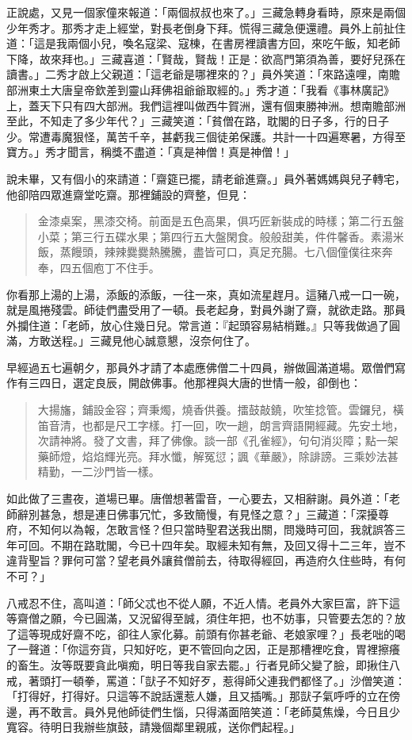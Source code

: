 正說處，又見一個家僮來報道：「兩個叔叔也來了。」三藏急轉身看時，原來是兩個少年秀才。那秀才走上經堂，對長老倒身下拜。慌得三藏急便還禮。員外上前扯住道：「這是我兩個小兒，喚名寇梁、寇棟，在書房裡讀書方回，來吃午飯，知老師下降，故來拜也。」三藏喜道：「賢哉，賢哉！正是：欲高門第須為善，要好兒孫在讀書。」二秀才啟上父親道：「這老爺是哪裡來的？」員外笑道：「來路遠哩，南贍部洲東土大唐皇帝欽差到靈山拜佛祖爺爺取經的。」秀才道：「我看《事林廣記》上，蓋天下只有四大部洲。我們這裡叫做西牛賀洲，還有個東勝神洲。想南贍部洲至此，不知走了多少年代？」三藏笑道：「貧僧在路，耽閣的日子多，行的日子少。常遭毒魔狠怪，萬苦千辛，甚虧我三個徒弟保護。共計一十四遍寒暑，方得至寶方。」秀才聞言，稱獎不盡道：「真是神僧！真是神僧！」

說未畢，又有個小的來請道：「齋筵已擺，請老爺進齋。」員外著媽媽與兒子轉宅，他卻陪四眾進齋堂吃齋。那裡鋪設的齊整，但見：
\begin{quote}
金漆桌案，黑漆交椅。前面是五色高果，俱巧匠新裝成的時樣；第二行五盤小菜；第三行五碟水果；第四行五大盤閑食。般般甜美，件件馨香。素湯米飯，蒸饅頭，辣辣爨爨熱騰騰，盡皆可口，真足充腸。七八個僮僕往來奔奉，四五個庖丁不住手。
\end{quote}

你看那上湯的上湯，添飯的添飯，一往一來，真如流星趕月。這豬八戒一口一碗，就是風捲殘雲。師徒們盡受用了一頓。長老起身，對員外謝了齋，就欲走路。那員外攔住道：「老師，放心住幾日兒。常言道：『起頭容易結梢難。』只等我做過了圓滿，方敢送程。」三藏見他心誠意懇，沒奈何住了。

早經過五七遍朝夕，那員外才請了本處應佛僧二十四員，辦做圓滿道場。眾僧們寫作有三四日，選定良辰，開啟佛事。他那裡與大唐的世情一般，卻倒也：
\begin{quote}
大揚旛，鋪設金容；齊秉燭，燒香供養。擂鼓敲鐃，吹笙捻管。雲鑼兒，橫笛音清，也都是尺工字樣。打一回，吹一趟，朗言齊語開經藏。先安土地，次請神將。發了文書，拜了佛像。談一部《孔雀經》，句句消災障；點一架藥師燈，焰焰輝光亮。拜水懺，解冤愆；諷《華嚴》，除誹謗。三乘妙法甚精勤，一二沙門皆一樣。
\end{quote}

如此做了三晝夜，道場已畢。唐僧想著雷音，一心要去，又相辭謝。員外道：「老師辭別甚急，想是連日佛事冗忙，多致簡慢，有見怪之意？」三藏道：「深擾尊府，不知何以為報，怎敢言怪？但只當時聖君送我出關，問幾時可回，我就誤答三年可回。不期在路耽閣，今已十四年矣。取經未知有無，及回又得十二三年，豈不違背聖旨？罪何可當？望老員外讓貧僧前去，待取得經回，再造府久住些時，有何不可？」

八戒忍不住，高叫道：「師父忒也不從人願，不近人情。老員外大家巨富，許下這等齋僧之願，今已圓滿，又況留得至誠，須住年把，也不妨事，只管要去怎的？放了這等現成好齋不吃，卻往人家化募。前頭有你甚老爺、老娘家哩？」長老咄的喝了一聲道：「你這夯貨，只知好吃，更不管回向之因，正是那槽裡吃食，胃裡擦癢的畜生。汝等既要貪此嗔痴，明日等我自家去罷。」行者見師父變了臉，即揪住八戒，著頭打一頓拳，罵道：「獃子不知好歹，惹得師父連我們都怪了。」沙僧笑道：「打得好，打得好。只這等不說話還惹人嫌，且又插嘴。」那獃子氣呼呼的立在傍邊，再不敢言。員外見他師徒們生惱，只得滿面陪笑道：「老師莫焦燥，今日且少寬容。待明日我辦些旗鼓，請幾個鄰里親戚，送你們起程。」

